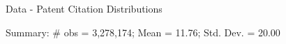 \documentclass[11pt]{beamer}
\begin{document}
\begin{frame}{Data - Patent Citation Distributions}
	\begin{center}
	\begin{figure}\centering\label{Innov7}
	\begin{minipage}[b]{0.45\linewidth}
	\end{minipage}
	\begin{minipage}[b]{0.45\linewidth}
	\end{minipage}
	\end{figure}
	\end{center}
	Summary: \# obs = 3,278,174; Mean = 11.76; Std. Dev. = 20.00
\end{frame}
\end{document}
